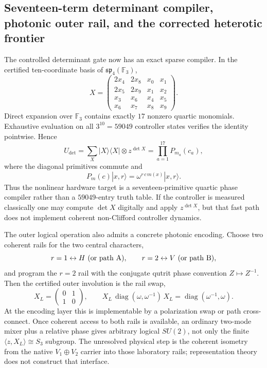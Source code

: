 \subsection{Seventeen-term determinant compiler, photonic outer rail, and the corrected heterotic frontier}
\label{sec:20260918-det17-outer-rail-z6-correction}

The controlled determinant gate now has an exact sparse compiler. In the
certified ten-coordinate basis of \(\mathfrak{sp}_4(\mathbb F_3)\),
\[
X=
\begin{pmatrix}
2x_4&2x_8&x_0&x_1\\
2x_5&2x_9&x_1&x_2\\
x_3&x_6&x_4&x_5\\
x_6&x_7&x_8&x_9
\end{pmatrix}.
\]
Direct expansion over \(\mathbb F_3\) contains exactly \(17\) nonzero quartic
monomials. Exhaustive evaluation on all \(3^{10}=59049\) controller states
verifies the identity pointwise. Hence
\[
 U_{\det}
 =\sum_X |X\rangle\!\langle X|\otimes z^{\det X}
 =\prod_{a=1}^{17}P_{m_a}(c_a),
\]
where the diagonal primitives commute and
\[
 P_m(c)|x,r\rangle=\omega^{r\,c\,m(x)}|x,r\rangle.
\]
Thus the nonlinear hardware target is a seventeen-primitive quartic phase
compiler rather than a \(59049\)-entry truth table. If the controller is
measured classically one may compute \(\det X\) digitally and apply
\(z^{\det X}\), but that fast path does not implement coherent non-Clifford
controller dynamics.

The outer logical operation also admits a concrete photonic encoding. Choose
two coherent rails for the two central characters,
\[
 r=1\leftrightarrow H\ {\rm(or\ path\ A)},\qquad
 r=2\leftrightarrow V\ {\rm(or\ path\ B)},
\]
and program the \(r=2\) rail with the conjugate qutrit phase convention
\(Z\mapsto Z^{-1}\). Then the certified outer involution is the rail swap,
\[
 X_L=
 \begin{pmatrix}0&1\\1&0\end{pmatrix},
 \qquad
 X_L\,\operatorname{diag}(\omega,\omega^{-1})\,X_L
 =\operatorname{diag}(\omega^{-1},\omega).
\]
At the encoding layer this is implementable by a polarization swap or path
cross-connect. Once coherent access to both rails is available, an ordinary
two-mode mixer plus a relative phase gives arbitrary logical \(SU(2)\), not
only the finite \(\langle z,X_L\rangle\cong S_3\) subgroup. The unresolved
physical step is the coherent isometry from the native
\(V_1\oplus V_2\) carrier into those laboratory rails; representation theory
does not construct that interface.

